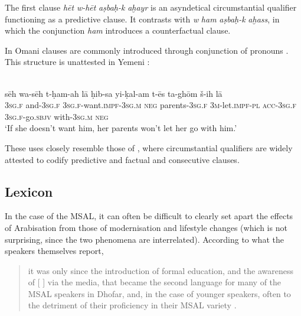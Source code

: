 \documentclass[output=paper]{langsci/langscibook}
\begin{document}
The first clause \textit{hēt} \textit{w-hēt} \textit{aṣbaḥ-k } \textit{aḫayr} is an asyndetical circumstantial qualifier functioning as a predictive  clause. It contrasts with \textit{w} \textit{ham} \textit{aṣbaḥ-k} \textit{aḫass}, in which the conjunction \textit{ham} introduces a counterfactual  clause. 

In Omani   clauses are commonly introduced through conjunction of pronouns \citep[211]{WatsonAl-Mahriforthcoming}. This structure is unattested in Yemeni :

\ea\label{ex:key:}
{ \citep[211]{WatsonAl-Mahriforthcoming}}\\
\gll     sēh wa-sēh t-ḥam-ah lā ḥib-sa yi-ḳal-am t-ēs ta-ghōm š-ih lā\\
     \textsc{3sg.f} and-\textsc{3sg.f} \textsc{3sg.f}{}-want.\textsc{impf-3sg.m} \textsc{neg} parents-\textsc{3sg.f} \textsc{3m}-let.\textsc{impf-pl} \textsc{acc-3sg.f} \textsc{3sg.f}-go.\textsc{sbjv} with-\textsc{3sg.m} \textsc{neg}\\
\glt  `If she doesn’t want him, her parents won’t let her go with him.'\\
\z
     
These uses closely resemble those of  , where circumstantial qualifiers are widely attested to codify predictive and factual  and consecutive clauses.


 
 \subsection{Lexicon}\label{sec:key:lex}


In the case of the MSAL, it can often be difficult to clearly set apart the effects of Arabisation from those of modernisation and lifestyle changes (which is not surprising, since the two phenomena are interrelated). According to what the speakers themselves report, 

\begin{quote}
{it was only since the introduction of formal education, and the awareness of} [ ] via the media, that  became the second language for many of the MSAL speakers in Dhofar, and, in the case of younger speakers, often to the detriment of their proficiency in their MSAL variety \citep[11]{Davey2016}.
\end{quote}
\end{document}
